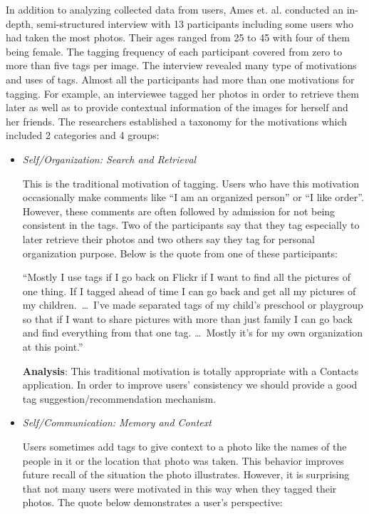 In addition to analyzing collected data from users, Ames et. al. conducted an in-depth, semi-structured interview with 13 participants including some users who had taken the most photos. Their ages ranged from 25 to 45 with four of them being female. The tagging frequency of each participant covered from zero to more than five tags per image. The interview revealed many type of motivations and uses of tags. Almost all the participants had more than one motivations for tagging. For example, an interviewee tagged her photos in order to retrieve them later as well as to provide contextual information of the images for herself and her friends. The researchers established a taxonomy for the motivations which included 2 categories and 4 groups:

\begin{itemize}
    \item \textit{Self/Organization: Search and Retrieval}
        
        This is the traditional motivation of tagging. Users who have this motivation occasionally make comments like ``I am an organized person'' or ``I like order''. However, these comments are often followed by admission for not being consistent in the tags. Two of the participants say that they tag especially to later retrieve their photos and two others say they tag for personal organization purpose. Below is the quote from one of these participants:

      ``Mostly I use tags if I go back on Flickr if I want to find all the pictures of one thing. If I tagged ahead of time I can go back and get all my pictures of my children.\ \ldots \ I've made separated tags of my child's preschool or playgroup so that if I want to share pictures with more than just family I can go back and find everything from that one tag. \ldots \ Mostly it's for my own organization at this point.''

      \textbf{Analysis}: This traditional motivation is totally appropriate with a Contacts application. In order to improve users' consistency we should provide a good tag suggestion/recommendation mechanism.

  \item \textit{Self/Communication: Memory and Context}
      
      Users sometimes add tags to give context to a photo like the names of the people in it or the location that photo was taken. This behavior improves future recall of the situation the photo illustrates. However, it is surprising that not many users were motivated in this way when they tagged their photos. The quote below demonstrates a user's perspective:
      

\end{itemize}
